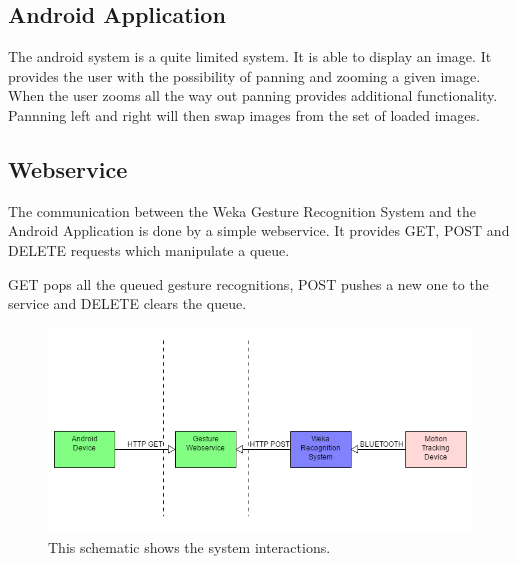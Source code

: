 \subsection{Android Application}
The android system is a quite limited system.
It is able to display  an image.
It provides the user with the possibility of panning and zooming a given image.
When the user zooms all the way out panning provides additional functionality.
Pannning left and right will then swap images from the set of loaded images.


\subsection{Webservice}
The communication between the Weka Gesture Recognition System and the Android Application is done by a simple webservice.
It provides GET, POST and DELETE requests which manipulate a queue.

GET pops all the queued gesture recognitions, 
POST pushes a new one to the service and DELETE clears the queue.

\begin{figure}[!h]
\centering
\includegraphics[width=0.9\columnwidth]{img/system_diagram}
\caption{This schematic shows the system interactions.}
\label{fig:figure4}
\end{figure}